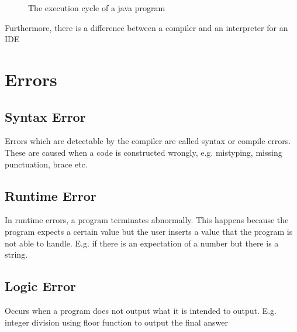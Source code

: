 \documentclass[11pt,a4 paper]{book}
\theoremstyle{plain}
\theoremstyle{definition}
\theoremstyle{remark}
\begin{document}
\begin{flushleft}
\begin{figure}[H]
\caption{The execution cycle of a java program}
\label{fig:cycle}
\end{figure}
\newpage
Furthermore, there is a difference between a compiler and an interpreter for an IDE
\begin{figure}[H]
\centering
{}
\label{fig:cycle}
\end{figure}
\section{Errors}
\subsection{Syntax Error}
Errors which are detectable by the compiler are called syntax or compile errors. These are caused when a code is constructed wrongly, e.g. mistyping, missing punctuation, brace etc.
\subsection{Runtime Error}
In runtime errors, a program terminates abnormally. This happens because the program expects a certain value but the user inserts a value that the program is not able to handle. E.g. if there is an expectation of a number but there is a string.
\subsection{Logic Error}
Occurs when a program does not output what it is intended to output. E.g. integer division using floor function to output the final answer

\end{flushleft}
\end{document}
